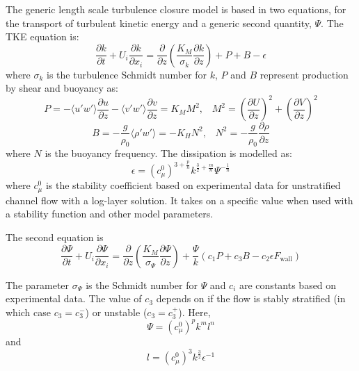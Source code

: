 The generic length scale turbulence closure model \citep{umlauf2003} is based in two equations, for the transport of turbulent kinetic energy and a generic second quantity, $\Psi$. The TKE equation is:
\begin{equation}
\frac{\partial k}{\partial t} + U_i\frac{\partial k}{\partial x_i} = \frac{\partial}{\partial z}\left(\frac{K_M}{\sigma_k}\frac{\partial k}{\partial z}\right) + P + B - \epsilon 
\label{tke_one}
\end{equation}
where $\sigma_k$ is the turbulence Schmidt number for $k$, $P$ and $B$ represent production by shear and buoyancy as:
\begin{equation}
P=-\langle u'w'\rangle\frac{\partial u}{\partial z}-\langle v'w' \rangle\frac{\partial v}{\partial z}=K_MM^2, \;\;\; M^2=\left(\frac{\partial U}{\partial z}\right)^2 + \left(\frac{\partial V}{\partial z}\right)^2 
\end{equation}
\begin{equation}
B=-\frac{g}{\rho_0}\langle\rho'w'\rangle=-K_HN^2, \;\;\; N^2= -\frac{g}{\rho_0}\frac{\partial\rho}{\partial z}
\end{equation}
where $N$ is the buoyancy frequency. The dissipation is modelled as:
\begin{equation}
\epsilon=\left(c_\mu^0\right)^{3+\frac{p}{n}}k^{\frac{3}{2}+\frac{m}{n}}\Psi^{-\frac{1}{n}}
\end{equation}
where $c_\mu^0$ is the stability coefficient based on experimental data for unstratified channel flow with a
log-layer solution. It takes on a specific value when used with a stability function and other model
parameters.

The second equation is 
\begin{equation}
\frac{\partial \Psi}{\partial t} + U_i\frac{\partial \Psi}{\partial x_i} = \frac{\partial}{\partial z}\left(\frac{K_M}{\sigma_\Psi}\frac{\partial \Psi}{\partial z}\right) + \frac{\Psi}{k}(c_1P + c_3B - c_2\epsilon F_{\mathrm{wall}})
\label{psi_one}
\end{equation}

The parameter $\sigma_\Psi$ is the Schmidt number for $\Psi$ and $c_i$ are constants based on experimental data. The value of $c_3$ depends on if the flow is stably stratified (in which case $c_3=c_3^-$) or unstable ($c_3=c_3^+$). Here,
\begin{equation}
\Psi=\left(c_\mu^0\right)^pk^ml^n
\end{equation}
and
\begin{equation}
l=\left(c_\mu^0\right)^3k^{\frac{3}{2}}\epsilon^{-1}
\end{equation}

